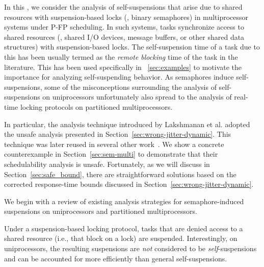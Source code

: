\label{sec:syn}

In this \mysectionrefnormal{}, we consider the analysis of self-suspensions that arise due to shared resources with suspension-based locks (\eg, binary semaphores) in multiprocessor systems under P-FP scheduling. In such systems, tasks synchronize access to shared resources (\eg, shared I/O devices, message buffers, or other shared data structures) with suspension-based locks. The self-suspension time of a task due to this has been usually termed as the \emph{remote blocking} time of the task in the literature. This has been used specifically in \mysectionref{}~\ref{sec:examples} to motivate the importance for analyzing self-suspending behavior. 
As semaphores induce self-suspensions, some of the misconceptions surrounding the analysis of self-suspensions on uniprocessors unfortunately also spread to the analysis of  real-time locking protocols on partitioned multiprocessors.


In particular, the analysis technique introduced by Lakshmanan et al. \cite{lakshmanan-2009} adopted the unsafe analysis presented in Section~\ref{sec:wrong-jitter-dynamic}. This technique was later reused in several other work~\cite{zeng-2011,bbb-2013,yang-2013,kim-2014,han-2014,carminati-2014,yang-2014}. We show a concrete counterexample in Section~\ref{sec:sem-multi} to demonstrate that their schedulability analysis is unsafe. Fortunately, as we will discuss in Section~\ref{sec:safe_bound}, there are straightforward solutions based on the corrected response-time bounds discussed in Section~\ref{sec:wrong-jitter-dynamic}.

We begin with a review of existing analysis strategies for semaphore-induced suspensions on uniprocessors and partitioned multiprocessors. 
 

\label{sec:sem-uni}

Under a suspension-based locking protocol, tasks that are denied access to a shared resource (i.e., that block on a lock) are suspended. Interestingly, on uniprocessors, the resulting suspensions are \emph{not} considered to be \emph{self}-suspensions and can be accounted for more efficiently than general self-suspensions.

